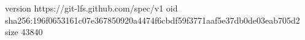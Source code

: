 version https://git-lfs.github.com/spec/v1
oid sha256:196f0653161c07e367850920a4474f6cbdf59f3771aaf5e37db0de03eab705d2
size 43840
